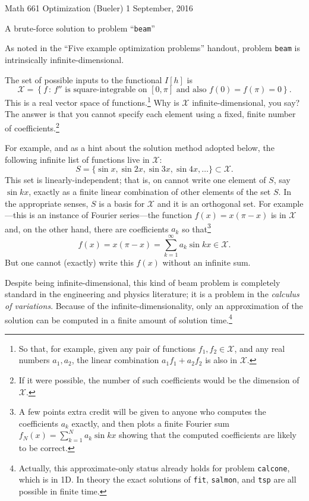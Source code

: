 \documentclass[11pt]{amsart}
\begin{document}
\scriptsize \noindent Math 661 Optimization (Bueler) \hfill 1 September, 2016
\normalsize

\medskip\bigskip
\Large
\centerline{A brute-force solution to problem ``\texttt{beam}''}

\bigskip\medskip
\normalsize

\thispagestyle{empty}

As noted in the ``Five example optimization problems'' handout, problem \texttt{beam} is intrinsically infinite-dimensional.

The set of possible inputs to the functional $I[h]$ is
    $$\mathcal{X} = \left\{f \,:\, f'' \text{ is square-integrable on } [0,\pi] \text{ and also } f(0)=f(\pi)=0\right\}.$$
This is a real vector space of functions.\footnote{So that, for example, given any pair of functions $f_1,f_2 \in \mathcal{X}$, and any real numbers $a_1,a_2$, the linear combination $a_1 f_1 + a_2 f_2$ is also in $\mathcal{X}$.}  Why is $\mathcal{X}$ infinite-dimensional, you say?  The answer is that you cannot specify each element using a fixed, finite number of coefficients.\footnote{If it were possible, the number of such coefficients would be the dimension of $\mathcal{X}$.}

For example, and as a hint about the solution method adopted below, the following infinite list of functions live in $\mathcal{X}$:
    $$S = \{\sin x, \sin 2 x, \sin 3 x, \sin 4 x, \dots\} \subset \mathcal{X}.$$
This set is linearly-independent; that is, on cannot write one element of $S$, say $\sin k x$, exactly as a finite linear combination of other elements of the set $S$.  In the appropriate senses, $S$ is a basis for $\mathcal{X}$ and it is an orthogonal set.  For example---this is an instance of Fourier series---the function $f(x) = x (\pi-x)$ is in $\mathcal{X}$ and, on the other hand, there are coefficients $a_k$ so that\footnote{A few points extra credit will be given to anyone who computes the coefficients $a_k$ exactly, and then plots a finite Fourier sum $f_N(x) = \sum_{k=1}^N a_k \sin k x$ showing that the computed coefficients are likely to be correct.}
    $$f(x) = x (\pi-x) = \sum_{k=1}^\infty a_k \sin k x \in \mathcal{X}.$$
But one cannot (exactly) write this $f(x)$ without an infinite sum.

Despite being infinite-dimensional, this kind of beam problem is completely standard in the engineering and physics literature; it is a problem in the \emph{calculus of variations}.  Because of the infinite-dimensionality, only an approximation of the solution can be computed in a finite amount of solution time.\footnote{Actually, this approximate-only status already holds for problem \texttt{calcone}, which is in 1D.  In theory the exact solutions of \texttt{fit}, \texttt{salmon}, and \texttt{tsp} are all possible in finite time.}
\end{document}

